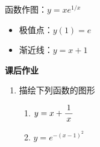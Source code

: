 \egz 函数作图：$y=xe^{1/x}$
\begin{itemize}
  \setlength{\itemindent}{1cm}
  \item 极值点：$y(1)=e$
  \item 渐近线：$y=x+1$
\end{itemize}

\begin{center}
\end{center}

\begin{ext}
	{\bf 课后作业}
	
	\begin{enumerate}
	  \item 描绘下列函数的图形
	  \begin{enumerate}[(1)]
		\item $y=x+\displaystyle\frac{\,{1}\,}{\,{x}\,}$
		\item $y=e^{-(x-1)^2}$
	  \end{enumerate}
	\end{enumerate}
\end{ext}

